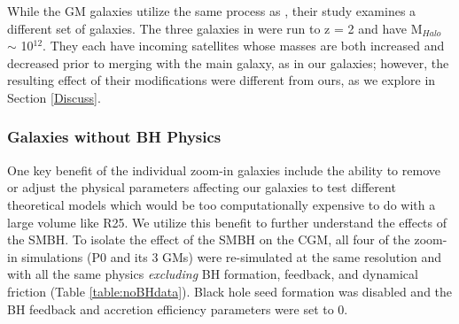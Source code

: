 \documentclass[]{emulateapj}
\begin{document}



While the GM galaxies utilize the same process as \cite{Pontzen2016}, their study examines a different set of galaxies. The three galaxies in \cite{Pontzen2016} were run to z = 2 and have M$_{Halo}$ $\sim$ 10$^{12}$. They each have incoming satellites whose masses are both increased and decreased prior to merging with the main galaxy, as in our galaxies; however, the resulting effect of their modifications were different from ours, as we explore in Section \ref{Discuss}.

\subsubsection{Galaxies without BH Physics}
One key benefit of the individual zoom-in galaxies include the ability to remove or adjust the physical parameters affecting our galaxies to test different theoretical models which would be too computationally expensive to do with a large volume like R25. We utilize this benefit to further understand the effects of the SMBH. To isolate the effect of the SMBH on the CGM, all four of the zoom-in simulations (P0 and its 3 GMs) were re-simulated at the same resolution and with all the same physics \textit{excluding} BH formation, feedback, and dynamical friction (Table \ref{table:noBHdata}). Black hole seed formation was disabled and the BH feedback and accretion efficiency parameters were set to 0.
\end{document}
